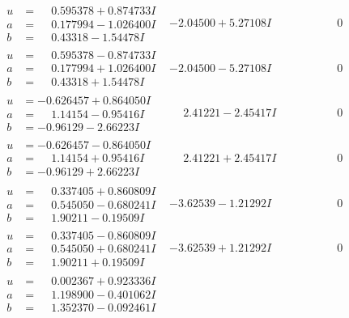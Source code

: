 \documentclass[1p]{elsarticle_modified}
\theoremstyle{definition}
\begin{document}
$$\begin{array}{c|c|c}
\begin{aligned}
u &= \phantom{-}0.595378 + 0.874733 I \\
a &= \phantom{-}0.177994 - 1.026400 I \\
b &= \phantom{-}0.43318 - 1.54478 I\end{aligned}
 & -2.04500 + 5.27108 I & \phantom{-0.000000 } 0 \\ \hline\begin{aligned}
u &= \phantom{-}0.595378 - 0.874733 I \\
a &= \phantom{-}0.177994 + 1.026400 I \\
b &= \phantom{-}0.43318 + 1.54478 I\end{aligned}
 & -2.04500 - 5.27108 I & \phantom{-0.000000 } 0 \\ \hline\begin{aligned}
u &= -0.626457 + 0.864050 I \\
a &= \phantom{-}1.14154 - 0.95416 I \\
b &= -0.96129 - 2.66223 I\end{aligned}
 & \phantom{-}2.41221 - 2.45417 I & \phantom{-0.000000 } 0 \\ \hline\begin{aligned}
u &= -0.626457 - 0.864050 I \\
a &= \phantom{-}1.14154 + 0.95416 I \\
b &= -0.96129 + 2.66223 I\end{aligned}
 & \phantom{-}2.41221 + 2.45417 I & \phantom{-0.000000 } 0 \\ \hline\begin{aligned}
u &= \phantom{-}0.337405 + 0.860809 I \\
a &= \phantom{-}0.545050 - 0.680241 I \\
b &= \phantom{-}1.90211 - 0.19509 I\end{aligned}
 & -3.62539 - 1.21292 I & \phantom{-0.000000 } 0 \\ \hline\begin{aligned}
u &= \phantom{-}0.337405 - 0.860809 I \\
a &= \phantom{-}0.545050 + 0.680241 I \\
b &= \phantom{-}1.90211 + 0.19509 I\end{aligned}
 & -3.62539 + 1.21292 I & \phantom{-0.000000 } 0 \\ \hline\begin{aligned}
u &= \phantom{-}0.002367 + 0.923336 I \\
a &= \phantom{-}1.198900 - 0.401062 I \\
b &= \phantom{-}1.352370 - 0.092461 I\end{aligned}

\end{array}$$
\end{document}
